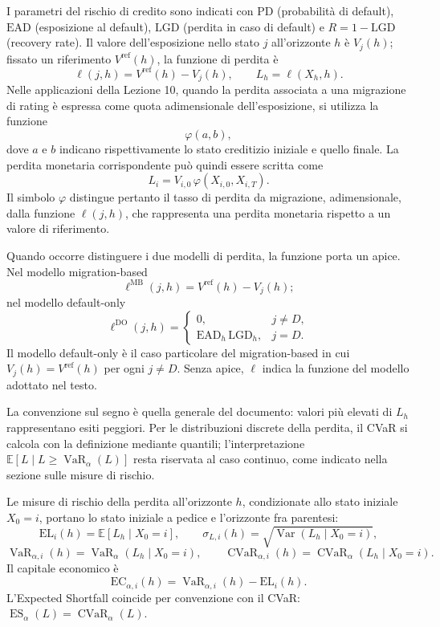 \documentclass[12pt,a4paper]{article}
\newcommand{\E}{\mathbb{E}}
\newcommand{\1}{\mathbf{1}}
\newcommand{\Var}{\operatorname{Var}}
\newcommand{\VaR}{\operatorname{VaR}}
\newcommand{\CVaR}{\operatorname{CVaR}}
\begin{document}
I parametri del rischio di credito sono indicati con $\mathrm{PD}$
(probabilit\`a di default), $\mathrm{EAD}$ (esposizione al default),
$\mathrm{LGD}$ (perdita in caso di default) e $R=1-\mathrm{LGD}$ (recovery
rate). Il valore dell'esposizione nello stato $j$ all'orizzonte $h$ \`e
$V_j(h)$; fissato un riferimento $V^{\mathrm{ref}}(h)$, la funzione di
perdita \`e
\[
\ell(j,h)=V^{\mathrm{ref}}(h)-V_j(h),
\qquad
L_h=\ell(X_h,h).
\]
Nelle applicazioni della Lezione 10, quando la perdita associata a una
migrazione di rating \`e espressa come quota adimensionale dell'esposizione,
si utilizza la funzione
\[
\varphi(a,b),
\]
dove $a$ e $b$ indicano rispettivamente lo stato creditizio iniziale e quello
finale. La perdita monetaria corrispondente pu\`o quindi essere scritta come
\[
L_i
=
V_{i,0}\,\varphi(X_{i,0},X_{i,T}).
\]
Il simbolo $\varphi$ distingue pertanto il tasso di perdita da migrazione,
adimensionale, dalla funzione $\ell(j,h)$, che rappresenta una perdita
monetaria rispetto a un valore di riferimento.

Quando occorre distinguere i due modelli di perdita, la funzione porta un
apice. Nel modello migration-based
\[
\ell^{\mathrm{MB}}(j,h)=V^{\mathrm{ref}}(h)-V_j(h);
\]
nel modello default-only
\[
\ell^{\mathrm{DO}}(j,h)=
\begin{cases}
0, & j\neq D,\\
\mathrm{EAD}_h\,\mathrm{LGD}_h, & j=D.
\end{cases}
\]
Il modello default-only \`e il caso particolare del migration-based in cui
$V_j(h)=V^{\mathrm{ref}}(h)$ per ogni $j\neq D$. Senza apice, $\ell$ indica
la funzione del modello adottato nel testo.



La convenzione sul segno \`e quella generale del documento: valori
pi\`u elevati di $L_h$ rappresentano esiti peggiori. Per le
distribuzioni discrete della perdita, il CVaR si calcola con la
definizione mediante quantili; l'interpretazione
$\E[L\mid L\geq\VaR_\alpha(L)]$ resta riservata al caso continuo, come
indicato nella sezione sulle misure di rischio.

Le misure di rischio della perdita all'orizzonte $h$, condizionate allo stato
iniziale $X_0=i$, portano lo stato iniziale a pedice e l'orizzonte fra
parentesi:
\[
\mathrm{EL}_i(h)=\E[L_h\mid X_0=i],
\qquad
\sigma_{L,i}(h)=\sqrt{\Var(L_h\mid X_0=i)},
\]
\[
\VaR_{\alpha,i}(h)=\VaR_{\alpha}(L_h\mid X_0=i),
\qquad
\CVaR_{\alpha,i}(h)=\CVaR_{\alpha}(L_h\mid X_0=i).
\]
Il capitale economico \`e
\[
\mathrm{EC}_{\alpha,i}(h)=\VaR_{\alpha,i}(h)-\mathrm{EL}_i(h).
\]
L'Expected Shortfall coincide per convenzione con il CVaR:
$\operatorname{ES}_{\alpha}(L)=\CVaR_{\alpha}(L)$.
\end{document}
